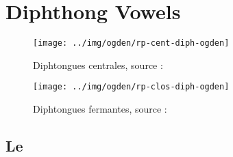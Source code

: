 \chapter{Diphthong Vowels}\label{chap:diphtong}

\begin{center}
  \begin{figure}[h]
    \centering
    \texttt{[image: ../img/ogden/rp-cent-diph-ogden]}
    \caption{Diphtongues centrales, source : \ogden }
    \label{fig:diph-cent}
  \end{figure}
\end{center}


\begin{center}
  \begin{figure}[h]
    \centering
    \texttt{[image: ../img/ogden/rp-clos-diph-ogden]}
    \caption{Diphtongues fermantes, source : \ogden }
    \label{fig:diph-ferm}
  \end{figure}
\end{center}


\newpage
\minitoc
\newpage

\section{Le \son {} }\label{sec:ei}

\flags
{}

